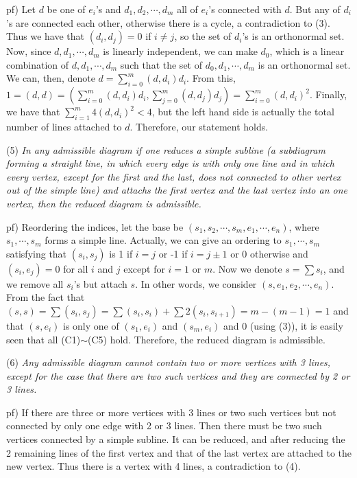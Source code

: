 \documentclass{article}
\begin{document}
pf) Let $d$ be one of $e_i$'s and $d_1, d_2, \cdots, d_m$ all of $e_i$'s connected with $d$.
But any of $d_i$'s are connected each other, otherwise there is a cycle, a contradiction to (3).
Thus we have that $(d_i, d_j) = 0$ if $i \ne j$, so the set of $d_i$'s is an orthonormal set.
Now, since $d, d_1, \cdots, d_m$ is linearly independent, we can make $d_0$, which is a linear combination of $d, d_1, \cdots, d_m$ such that the set of $d_0, d_1, \cdots, d_m$ is an orthonormal set.
We can, then, denote $d = \sum_{i = 0}^m (d, d_i) d_i$.
From this, $1 = (d, d) = \left( \sum_{i = 0}^m (d, d_i) d_i, \sum_{j = 0}^m (d, d_j) d_j \right) = \sum_{i = 0}^m (d, d_i)^2$.
Finally, we have that $\sum_{i = 1}^m 4(d, d_i)^2 < 4$, but the left hand side is actually the total number of lines attached to $d$.
Therefore, our statement holds.

(5) \textit{In any admissible diagram if one reduces a simple subline (a subdiagram forming a straight line, in which every edge is with only one line and in which every vertex, except for the first and the last, does not connected to other vertex out of the simple line) and attachs the first vertex and the last vertex into an one vertex, then the reduced diagram is admissible.}

pf) Reordering the indices, let the base be $(s_1, s_2, \cdots, s_m, e_1, \cdots, e_n)$, where $s_1, \cdots, s_m$ forms a simple line.
Actually, we can give an ordering to $s_1, \cdots, s_m$ satisfying that $(s_i, s_j)$ is 1 if $i = j$ or -1 if $i = j \pm 1$ or 0 otherwise and $(s_i, e_j) = 0$ for all $i$ and $j$ except for $i = 1\textrm{ or }m$.
Now we denote $s = \sum s_i$, and we remove all $s_i$'s but attach $s$.
In other words, we consider $(s, e_1, e_2, \cdots, e_n)$.
From the fact that $(s, s) = \sum (s_i, s_j) = \sum (s_i, s_i) + \sum 2(s_i, s_{i + 1}) = m - (m - 1) = 1$ and that $(s, e_i)$ is only one of $(s_1, e_i)$ and $(s_m, e_i)$ and 0 (using (3)), it is easily seen that all (C1)$\sim$(C5) hold.
Therefore, the reduced diagram is admissible.

(6) \textit{Any admissible diagram cannot contain two or more vertices with 3 lines, except for the case that there are two such vertices and they are connected by 2 or 3 lines.}

pf) If there are three or more vertices with 3 lines or two such vertices but not connected by only one edge with 2 or 3 lines.
Then there must be two such vertices connected by a simple subline.
It can be reduced, and after reducing the 2 remaining lines of the first vertex and that of the last vertex are attached to the new vertex.
Thus there is a vertex with 4 lines, a contradiction to (4).
\end{document}
